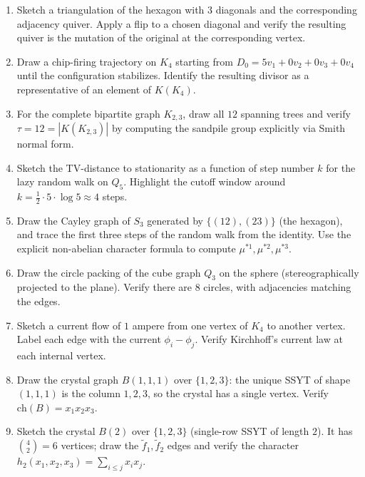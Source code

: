 \begin{enumerate}[resume]
\item Sketch a triangulation of the hexagon with $3$ diagonals and the
corresponding adjacency quiver. Apply a flip to a chosen diagonal and
verify the resulting quiver is the mutation of the original at the
corresponding vertex.

\item Draw a chip-firing trajectory on $K_4$ starting from
$D_0 = 5 v_1 + 0 v_2 + 0 v_3 + 0 v_4$ until the configuration
stabilizes. Identify the resulting divisor as a representative of an
element of $K(K_4)$.

\item For the complete bipartite graph $K_{2, 3}$, draw all $12$ spanning
trees and verify $\tau = 12 = |K(K_{2,3})|$ by computing the sandpile
group explicitly via Smith normal form.

\item Sketch the TV-distance to stationarity as a function of step number
$k$ for the lazy random walk on $Q_5$. Highlight the cutoff window
around $k = \tfrac{1}{2} \cdot 5 \cdot \log 5 \approx 4$ steps.

\item Draw the Cayley graph of $S_3$ generated by $\{(12), (23)\}$ (the
hexagon), and trace the first three steps of the random walk from the
identity. Use the explicit non-abelian character formula to compute
$\mu^{*1}, \mu^{*2}, \mu^{*3}$.

\item Draw the circle packing of the cube graph $Q_3$ on the sphere
(stereographically projected to the plane). Verify there are $8$
circles, with adjacencies matching the edges.

\item Sketch a current flow of $1$ ampere from one vertex of $K_4$ to another
vertex. Label each edge with the current $\phi_i - \phi_j$.
Verify Kirchhoff's current law at each internal vertex.

\item Draw the crystal graph $B(1, 1, 1)$ over $\{1, 2, 3\}$: the unique
SSYT of shape $(1, 1, 1)$ is the column $1, 2, 3$, so the crystal has
a single vertex. Verify $\mathrm{ch}(B) = x_1 x_2 x_3$.

\item Sketch the crystal $B(2)$ over $\{1, 2, 3\}$ (single-row SSYT of
length $2$). It has $\binom{4}{2} = 6$ vertices; draw the
$\widetilde f_1, \widetilde f_2$ edges and verify the character
$h_2(x_1, x_2, x_3) = \sum_{i \le j} x_i x_j$.
\end{enumerate}
